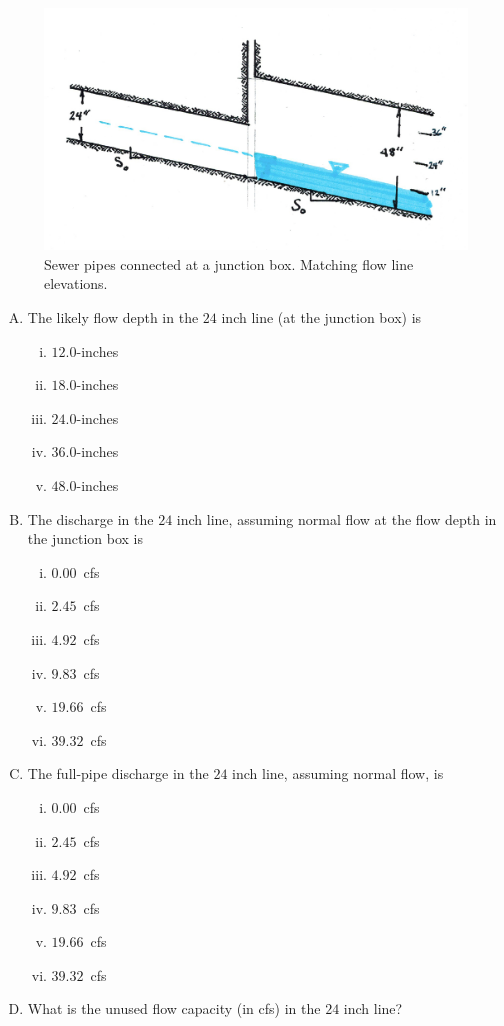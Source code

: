 \documentclass[11pt]{article}
\begin{document}
\begin{enumerate}
\begin{figure}[h!] %
\centering
   \includegraphics[width=5in]{SewerPipeMatchFlowline.jpg}
   \caption{Sewer pipes connected at a junction box.  Matching flow line elevations.}
   \label{fig:SewerPipeMatchFlowline} 
\end{figure}

\begin{enumerate}[(A)]
\item The likely flow depth in the $24$ inch line (at the junction box) is
\begin{enumerate} [i)]
\item $12.0$-inches 
\item $18.0$-inches 
\item $24.0$-inches 
\item $36.0$-inches
\item $48.0$-inches
\end{enumerate} 
\item The discharge in the $24$ inch line, assuming normal flow at the flow depth in the junction box is 
\begin{enumerate} [i)]
\item $0.00$~cfs
\item $2.45$~cfs
\item $4.92$~cfs
\item $9.83$~cfs 
\item $19.66$~cfs
\item $39.32$~cfs
\end{enumerate} 
\item The full-pipe discharge in the $24$ inch line, assuming normal flow, is
\begin{enumerate} [i)]
\item $0.00$~cfs
\item $2.45$~cfs
\item $4.92$~cfs
\item $9.83$~cfs 
\item $19.66$~cfs
\item $39.32$~cfs
\end{enumerate} 
\item What is the unused flow capacity (in cfs) in the $24$ inch line? ~\\ ~\\
\end{enumerate}


\end{enumerate}
\end{document}
